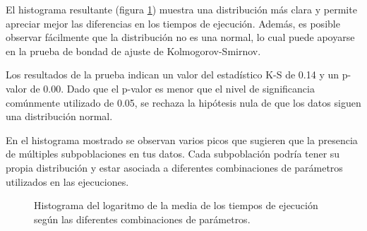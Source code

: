 El histograma resultante (figura \ref{figure:hist}) muestra una distribución más clara y permite apreciar mejor las diferencias en los tiempos de ejecución. Además, es posible observar fácilmente que la distribución no es una normal, lo cual puede apoyarse en la prueba de bondad de ajuste de Kolmogorov-Smirnov. 

Los resultados de la prueba indican un valor del estadístico K-S de 0.14 y un p-valor de 0.00. Dado que el p-valor es menor que el nivel de significancia comúnmente utilizado de 0.05, se rechaza la hipótesis nula de que los datos siguen una distribución normal. 

En el histograma mostrado se observan varios picos que sugieren que la presencia de múltiples subpoblaciones en tus datos. Cada subpoblación podría tener su propia distribución y estar asociada a diferentes combinaciones de parámetros utilizados en las ejecuciones.

\begin{figure}[h]
    \begin{center}
        \scalebox{0.7}{}
    \end{center}
    \caption{\label{figure:hist}Histograma del logaritmo de la media de los tiempos de ejecución según las diferentes combinaciones de parámetros.}
\end{figure}



